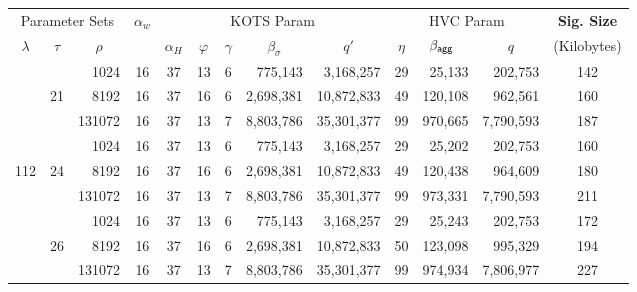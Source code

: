 \begin{table}\centering
    \begin{tabular}{ccr|c|cccrr|crr|c}%
  
      \multicolumn{3}{c|}{Parameter Sets}  
      & \multirow{2}{*}{$\alpha_w$}  
      & \multicolumn{5}{c|}{KOTS Param}  
      & \multicolumn{3}{c|}{HVC Param}  
      &  {\bf Sig. Size}\\%
      
      $\lambda$      & $\tau$
      & \multicolumn{1}{c|}{$\rho$}&   &$\alpha_H$& $\varphi$ 
      & $\gamma$                      & \multicolumn{1}{c}{$\beta_\sigma$}     
      & \multicolumn{1}{c|}{$q'$}                     & $\eta$       
      & $\beta_{\mathsf{agg}}\quad$                  & \multicolumn{1}{c|}{$q$} 
      & (Kilobytes) \\\toprule
  
  
      &       &   1024 &         16 &        37 &         13 &       6 &        775,143 &  3,168,257 &    29 &       25,133 &   202,753 & 142 \\%
      &    21 &   8192 &         16 &        37 &         16 &       6 &      2,698,381 & 10,872,833 &    49 &      120,108 &   962,561 & 160 \\%
      &       & 131072 &         16 &        37 &         13 &       7 &      8,803,786 & 35,301,377 &    99 &      970,665 & 7,790,593 & 187 \\\cline{2-13}
  
      &       &   1024 &         16 &        37 &         13 &       6 &        775,143 &  3,168,257 &    29 &       25,202 &   202,753 & 160 \\%
  112 &    24 &   8192 &         16 &        37 &         16 &       6 &      2,698,381 & 10,872,833 &    49 &      120,438 &   964,609 & 180 \\%
      &       & 131072 &         16 &        37 &         13 &       7 &      8,803,786 & 35,301,377 &    99 &      973,331 & 7,790,593 & 211 \\\cline{2-13}
  
      &       &   1024 &         16 &        37 &         13 &       6 &        775,143 &  3,168,257 &    29 &       25,243 &   202,753 & 172 \\%
      &    26 &   8192 &         16 &        37 &         16 &       6 &      2,698,381 & 10,872,833 &    50 &      123,098 &   995,329 & 194 \\%
      &       & 131072 &         16 &        37 &         13 &       7 &      8,803,786 & 35,301,377 &    99 &      974,934 & 7,806,977 & 227 \\\midrule
  

\end{tabular}
\end{table}
